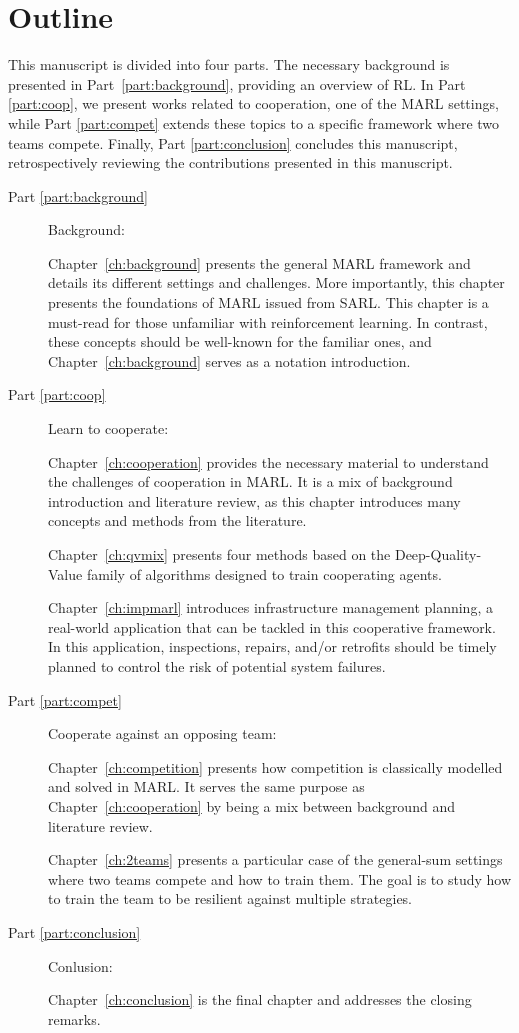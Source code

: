 \section{Outline}
\label{sec:ch1_outline}
This manuscript is divided into four parts.
The necessary background is presented in Part~\ref{part:background}, providing an overview of RL.
In Part \ref{part:coop}, we present works related to cooperation, one of the MARL settings, while Part \ref{part:compet} extends these topics to a specific framework where two teams compete.
Finally, Part \ref{part:conclusion} concludes this manuscript, retrospectively reviewing the contributions presented in this manuscript.

\begin{description}
    \item [Part \ref{part:background}] Background:
    
    Chapter~\ref{ch:background} presents the general MARL framework and details its different settings and challenges.
    More importantly, this chapter presents the foundations of MARL issued from SARL.
    This chapter is a must-read for those unfamiliar with reinforcement learning. 
    In contrast, these concepts should be well-known for the familiar ones, and Chapter~\ref{ch:background} serves as a notation introduction.

    \item [Part \ref{part:coop}] Learn to cooperate:
    
    Chapter~\ref{ch:cooperation} provides the necessary material to understand the challenges of cooperation in MARL.
    It is a mix of background introduction and literature review, as this chapter introduces many concepts and methods from the literature.
    
    Chapter~\ref{ch:qvmix} presents four methods based on the Deep-Quality-Value family of algorithms designed to train cooperating agents.
    
    Chapter~\ref{ch:impmarl} introduces infrastructure management planning, a real-world application that can be tackled in this cooperative framework.
    In this application, inspections, repairs, and/or retrofits should be timely planned to control the risk of potential system failures.
    
    \item [Part \ref{part:compet}]  Cooperate against an opposing team:
    
    Chapter~\ref{ch:competition} presents how competition is classically modelled and solved in MARL.
    It serves the same purpose as Chapter~\ref{ch:cooperation} by being a mix between background and literature review.
    
    Chapter~\ref{ch:2teams} presents a particular case of the general-sum settings where two teams compete and how to train them.
    The goal is to study how to train the team to be resilient against multiple strategies.

    \item [Part \ref{part:conclusion}] Conlusion:
    
    Chapter~\ref{ch:conclusion} is the final chapter and addresses the closing remarks.
\end{description}

